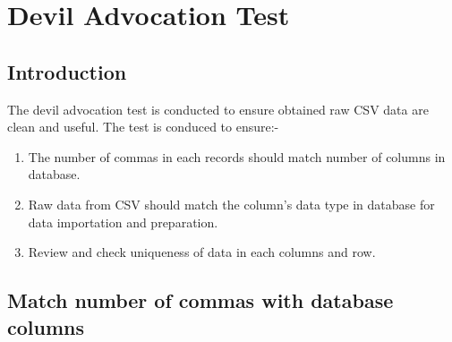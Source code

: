 \chapter{Devil Advocation Test} 
\label{AppendixB} 


\section{Introduction}
The devil advocation test is conducted to ensure obtained raw CSV data are clean and useful. The test is conduced to ensure:- 

\begin{enumerate}[topsep=0pt,itemsep=-1ex,partopsep=1ex,parsep=1.5ex]
	\item The number of commas in each records should match number of columns in database.
	\item Raw data from CSV should match the column's data type in database for data importation and preparation.
	\item Review and check uniqueness of data in each columns and row.
\end{enumerate}  

\pagebreak

\section{Match number of commas with database columns}

